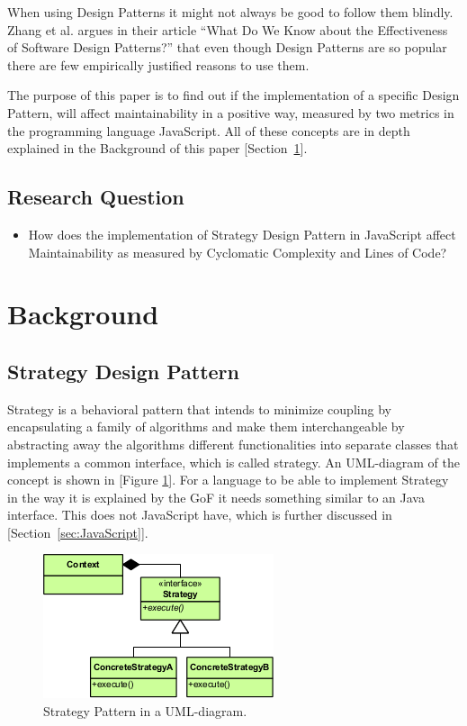 \documentclass[conference, a4paper]{IEEEtran}
\begin{document}
When using Design Patterns it might not always be good to follow them blindly. Zhang et al. argues in their article ``What Do We Know about the Effectiveness of Software Design Patterns?'' that even though Design Patterns are so popular there are few empirically justified reasons to use them.~\cite{bibitem:Zhang}

The purpose of this paper is to find out if the implementation of a specific Design Pattern, will affect maintainability in a positive way, measured by two metrics in the programming language JavaScript. All of these concepts are in depth explained in the Background of this paper [Section~\ref{sec:Background}].

\subsection{Research Question}
\begin{itemize}
	\item How does the implementation of Strategy Design Pattern in JavaScript affect Maintainability as measured by Cyclomatic Complexity and Lines of Code?
\end{itemize}

\section{Background}
\label{sec:Background}

\subsection{Strategy Design Pattern}
\label{sec:Strategy}

Strategy is a behavioral pattern that intends to minimize coupling by encapsulating a family of algorithms and make them interchangeable by abstracting away the algorithms different functionalities into separate classes that implements a common interface, which is called strategy. An UML-diagram of the concept is shown in [Figure \ref{fig:Strategy}]. For a language to be able to implement Strategy in the way it is explained by the GoF it needs something similar to an Java interface. This does not JavaScript have, which is further discussed in [Section~\ref{sec:JavaScript}].~\cite{bibitem:GoF}

\begin{figure}[ht!]
	\centering
	\includegraphics[scale=0.7]{Strategy_Pattern_in_UML.png}
	\caption{Strategy Pattern in a UML-diagram.}
	\label{fig:Strategy}
\end{figure}
\end{document}
